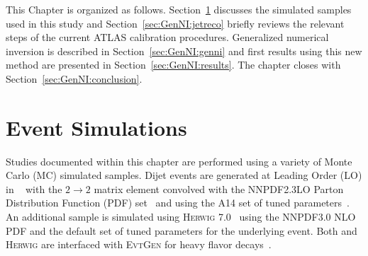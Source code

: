 This Chapter is organized as follows.
Section~\ref{sec:GenNI:atlas} discusses the simulated samples used in this study and Section~\ref{sec:GenNI:jetreco} briefly reviews the relevant steps of the current ATLAS calibration procedures.
Generalized numerical inversion is described in Section~\ref{sec:GenNI:genni} and first results using this new method are presented in Section~\ref{sec:GenNI:results}.
The chapter closes with Section~\ref{sec:GenNI:conclusion}.

\section{Event Simulations}
\label{sec:GenNI:atlas}

Studies documented within this chapter are performed using a variety of Monte Carlo (MC) simulated samples.
Dijet events are generated at Leading Order (LO) in ~\cite{Sjostrand:2007gs} with the $2 \rightarrow 2$ matrix element convolved with the NNPDF2.3LO Parton Distribution Function (PDF) set~\cite{Ball:2012cx} and using the A14 set of tuned parameters~\cite{ATL-PHYS-PUB-2014-021}.
An additional sample is simulated using \textsc{Herwig} 7.0~\cite{Bellm:2015jjp} using the NNPDF3.0 NLO PDF and the default set of tuned parameters for the underlying event.
Both \PYTHIA and \textsc{Herwig} are interfaced with \textsc{EvtGen} for heavy flavor decays~\cite{Lange:2001uf,ATL-PHYS-PUB-2014-008}.


